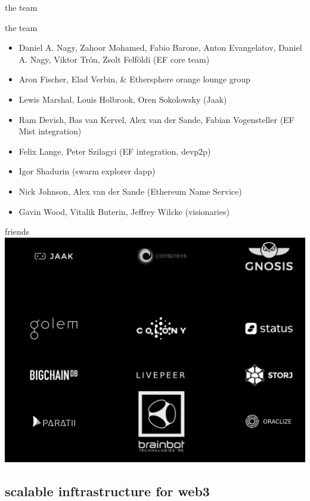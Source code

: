 \documentclass{beamer}
\begin{document}
\begin{frame}[plain]{the team}

\begin{block}{the team}
\begin{itemize}
\item Daniel A. Nagy, Zahoor Mohamed, Fabio Barone, Anton Evangelatov, Daniel A. Nagy, Viktor Trón, Zsolt Felföldi (EF core team)
\item Aron Fischer, Elad Verbin, \& Ethersphere orange lounge group
\item Lewis Marshal, Louis Holbrook, Oren Sokolowsky (Jaak)
\item Ram Devish, Bas van Kervel, Alex van der Sande, Fabian Vogensteller (EF Mist integration)
\item Felix Lange, Peter Szilagyi (EF integration, devp2p)
\item Igor Shadurin (swarm explorer dapp)
\item Nick Johnson, Alex van der Sande (Ethereum Name Service)
\item Gavin Wood, Vitalik Buterin, Jeffrey Wilcke (visionaries)
\end{itemize}
\end{block}

\end{frame}


\begin{frame}[plain]{friends}
  \includegraphics[width=\textwidth]{friends.png}

\end{frame}

\subsection{scalable inftrastructure for web3}
\end{document}
